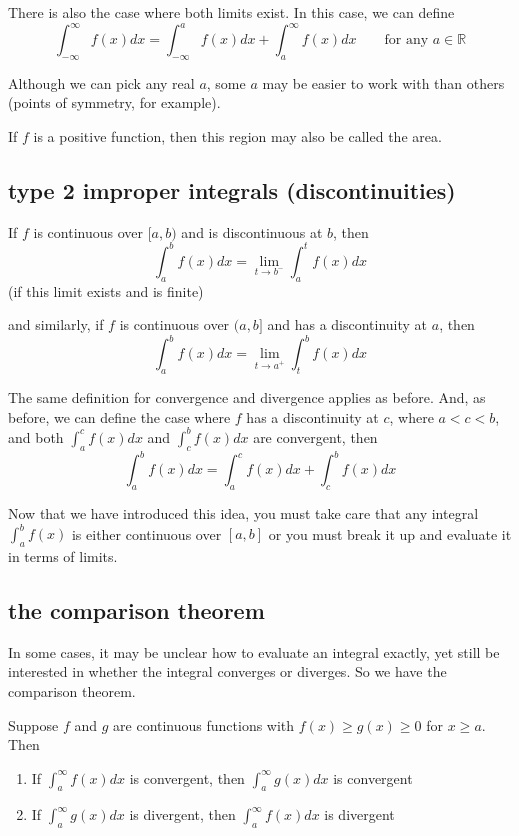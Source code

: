 \documentclass[10pt,a4paper]{report}
\begin{document}
There is also the case where both limits exist. In this case, we can define
$$
	\int_{-\infty}^{\infty} f(x) dx = \int_{-\infty}^a f(x) dx + \int_a^{\infty} f(x) dx \qquad \text{for any } a \in \mathbb{R}
$$

Although we can pick any real $a$, some $a$ may be easier to work with than others (points of symmetry, for example).

If $f$ is a positive function, then this region may also be called the area.


\subsection{type 2 improper integrals (discontinuities)}

If $f$ is continuous over $[a, b)$ and is discontinuous at $b$, then
$$
	\int_a^b f(x)dx = \lim_{t \to b^-} \int_a^t f(x) dx
$$
(if this limit exists and is finite)

and similarly, if $f$ is continuous over $(a, b]$ and has a discontinuity at $a$, then
$$
	\int_a^b f(x)dx = \lim_{t \to a^+} \int_t^b f(x) dx
$$

The same definition for convergence and divergence applies as before. And, as before, we can define the case where $f$ has a discontinuity at $c$, where $a < c < b$, and both $\int_a^c f(x)dx$ and $\int_c^b f(x) dx$ are convergent, then
$$
	\int_a^b f(x) dx = \int_a^c f(x) dx + \int_c^b f(x) dx
$$

Now that we have introduced this idea, you must take care that any integral $\int_a^b f(x)$ is either continuous over $[a, b]$ or you must break it up and evaluate it in terms of limits.

\subsection{the comparison theorem}

In some cases, it may be unclear how to evaluate an integral exactly, yet still be interested in whether the integral converges or diverges. So we have the comparison theorem.

Suppose $f$ and $g$ are continuous functions with $f(x) \geq g(x) \geq 0$ for $x \geq a$. Then
\begin{enumerate}
	\item If $\int_a^{\infty} f(x) dx$ is convergent, then $\int_a^{\infty} g(x) dx$ is convergent
	\item If $\int_a^{\infty} g(x) dx$ is divergent, then $\int_a^{\infty} f(x) dx$ is divergent
\end{enumerate}
\end{document}
